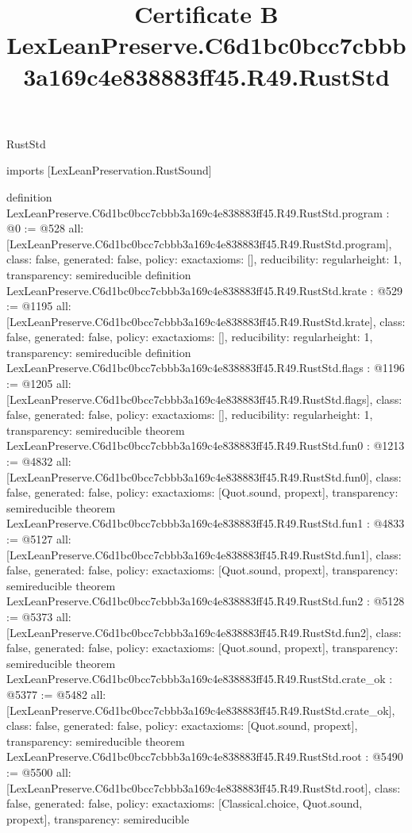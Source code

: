 \begin{lexlean}{RustStd}
\title{Certificate B LexLeanPreserve.C6d1bc0bcc7cbbb3a169c4e838883ff45.R49.RustStd}
\begin{coremodule}
imports [LexLeanPreservation.RustSound]

definition LexLeanPreserve.C6d1bc0bcc7cbbb3a169c4e838883ff45.R49.RustStd.program : @0 := @528 {
  all: [LexLeanPreserve.C6d1bc0bcc7cbbb3a169c4e838883ff45.R49.RustStd.program],
  class: false,
  generated: false,
  policy: exact{axioms: []},
  reducibility: regular{height: 1},
  transparency: semireducible
}
definition LexLeanPreserve.C6d1bc0bcc7cbbb3a169c4e838883ff45.R49.RustStd.krate : @529 := @1195 {
  all: [LexLeanPreserve.C6d1bc0bcc7cbbb3a169c4e838883ff45.R49.RustStd.krate],
  class: false,
  generated: false,
  policy: exact{axioms: []},
  reducibility: regular{height: 1},
  transparency: semireducible
}
definition LexLeanPreserve.C6d1bc0bcc7cbbb3a169c4e838883ff45.R49.RustStd.flags : @1196 := @1205 {
  all: [LexLeanPreserve.C6d1bc0bcc7cbbb3a169c4e838883ff45.R49.RustStd.flags],
  class: false,
  generated: false,
  policy: exact{axioms: []},
  reducibility: regular{height: 1},
  transparency: semireducible
}
theorem LexLeanPreserve.C6d1bc0bcc7cbbb3a169c4e838883ff45.R49.RustStd.fun0 : @1213 := @4832 {
  all: [LexLeanPreserve.C6d1bc0bcc7cbbb3a169c4e838883ff45.R49.RustStd.fun0],
  class: false,
  generated: false,
  policy: exact{axioms: [Quot.sound, propext]},
  transparency: semireducible
}
theorem LexLeanPreserve.C6d1bc0bcc7cbbb3a169c4e838883ff45.R49.RustStd.fun1 : @4833 := @5127 {
  all: [LexLeanPreserve.C6d1bc0bcc7cbbb3a169c4e838883ff45.R49.RustStd.fun1],
  class: false,
  generated: false,
  policy: exact{axioms: [Quot.sound, propext]},
  transparency: semireducible
}
theorem LexLeanPreserve.C6d1bc0bcc7cbbb3a169c4e838883ff45.R49.RustStd.fun2 : @5128 := @5373 {
  all: [LexLeanPreserve.C6d1bc0bcc7cbbb3a169c4e838883ff45.R49.RustStd.fun2],
  class: false,
  generated: false,
  policy: exact{axioms: [Quot.sound, propext]},
  transparency: semireducible
}
theorem LexLeanPreserve.C6d1bc0bcc7cbbb3a169c4e838883ff45.R49.RustStd.crate_ok : @5377 := @5482 {
  all: [LexLeanPreserve.C6d1bc0bcc7cbbb3a169c4e838883ff45.R49.RustStd.crate_ok],
  class: false,
  generated: false,
  policy: exact{axioms: [Quot.sound, propext]},
  transparency: semireducible
}
theorem LexLeanPreserve.C6d1bc0bcc7cbbb3a169c4e838883ff45.R49.RustStd.root : @5490 := @5500 {
  all: [LexLeanPreserve.C6d1bc0bcc7cbbb3a169c4e838883ff45.R49.RustStd.root],
  class: false,
  generated: false,
  policy: exact{axioms: [Classical.choice, Quot.sound, propext]},
  transparency: semireducible
}


\end{coremodule}
\end{lexlean}
